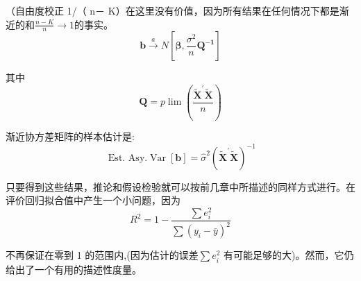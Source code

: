 （自由度校正 1/（ n－ K）在这里没有价值，因为所有结果在任何情况下都是渐近的和$ \frac{n-K}{n} \rightarrow 1 $的事实。
$$  \boldsymbol{b} \stackrel{a}{\longrightarrow} N\left[ \boldsymbol{\beta}, \frac{\sigma^{2}}{n}  \boldsymbol{Q^{-1}} \right] $$

其中
$$  \boldsymbol{Q} = p \lim \left(\frac{ \boldsymbol{\tilde{X}^{\prime} \tilde{X}}}{n}\right) $$

渐近协方差矩阵的样本估计是:
$$ \text { Est. Asy.}\operatorname{Var}[ \boldsymbol{b}]=\hat{\sigma}^{2}\left( \boldsymbol{\tilde{X}^{\prime} \tilde{X}}\right)^{-1} $$

只要得到这些结果，推论和假设检验就可以按前几章中所描述的同样方式进行。在评价回归拟合值中产生一个小问题，因为
$$ R^{2}=1-\frac{\sum e_{i}^{2}}{\sum\left(y_{i}-\bar{y}\right)^{2}} $$

不再保证在零到 1 的范围内,(因为估计的误差$\sum e_{i}^{2}$ 有可能足够的大)。然而，它仍给出了一个有用的描述性度量。